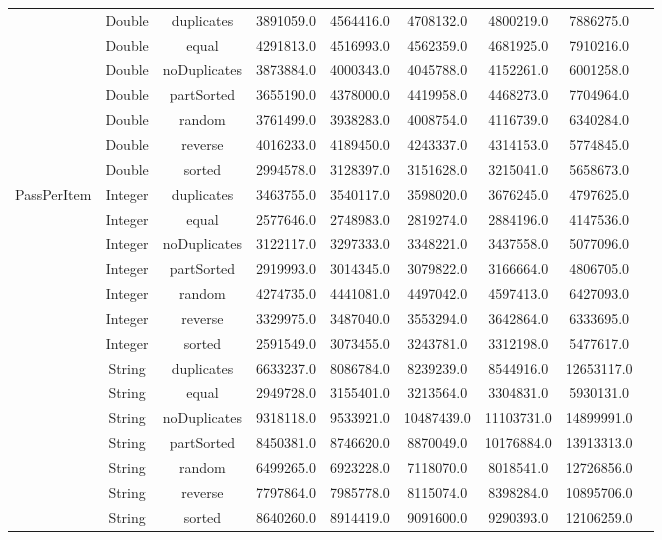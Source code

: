 \documentclass{article}
\begin{document}
\begin{table}[H]
\begin{tabular}{|c|c|c|c|c|c|c|c|c|}
        & Double & duplicates & 3891059.0 & 4564416.0 & 4708132.0 & 4800219.0 & 7886275.0 \\
        & Double & equal & 4291813.0 & 4516993.0 & 4562359.0 & 4681925.0 & 7910216.0 \\
        & Double & noDuplicates & 3873884.0 & 4000343.0 & 4045788.0 & 4152261.0 & 6001258.0 \\
        & Double & partSorted & 3655190.0 & 4378000.0 & 4419958.0 & 4468273.0 & 7704964.0 \\
        & Double & random & 3761499.0 & 3938283.0 & 4008754.0 & 4116739.0 & 6340284.0 \\
        & Double & reverse & 4016233.0 & 4189450.0 & 4243337.0 & 4314153.0 & 5774845.0 \\
        & Double & sorted & 2994578.0 & 3128397.0 & 3151628.0 & 3215041.0 & 5658673.0 \\
        PassPerItem
        & Integer & duplicates & 3463755.0 & 3540117.0 & 3598020.0 & 3676245.0 & 4797625.0 \\
        & Integer & equal & 2577646.0 & 2748983.0 & 2819274.0 & 2884196.0 & 4147536.0 \\
        & Integer & noDuplicates & 3122117.0 & 3297333.0 & 3348221.0 & 3437558.0 & 5077096.0 \\
        & Integer & partSorted & 2919993.0 & 3014345.0 & 3079822.0 & 3166664.0 & 4806705.0 \\
        & Integer & random & 4274735.0 & 4441081.0 & 4497042.0 & 4597413.0 & 6427093.0 \\
        & Integer & reverse & 3329975.0 & 3487040.0 & 3553294.0 & 3642864.0 & 6333695.0 \\
        & Integer & sorted & 2591549.0 & 3073455.0 & 3243781.0 & 3312198.0 & 5477617.0 \\
        
        & String & duplicates & 6633237.0 & 8086784.0 & 8239239.0 & 8544916.0 & 12653117.0 \\
        & String & equal & 2949728.0 & 3155401.0 & 3213564.0 & 3304831.0 & 5930131.0 \\
        & String & noDuplicates & 9318118.0 & 9533921.0 & 10487439.0 & 11103731.0 & 14899991.0 \\
        & String & partSorted & 8450381.0 & 8746620.0 & 8870049.0 & 10176884.0 & 13913313.0 \\
        & String & random & 6499265.0 & 6923228.0 & 7118070.0 & 8018541.0 & 12726856.0 \\
        & String & reverse & 7797864.0 & 7985778.0 & 8115074.0 & 8398284.0 & 10895706.0 \\
        & String & sorted & 8640260.0 & 8914419.0 & 9091600.0 & 9290393.0 & 12106259.0 \\
        

\end{tabular}
\end{table}
\end{document}
